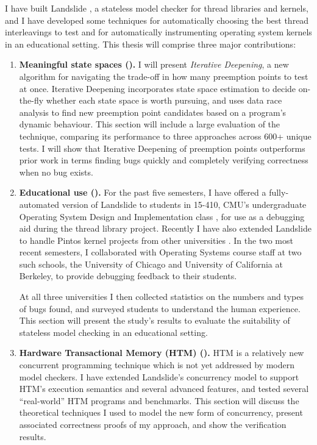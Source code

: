 \vspace{0.75em}

I have built Landslide \cite{landslide}, a stateless model checker for thread libraries and kernels,
and I have developed some techniques for automatically choosing the best thread interleavings to test
and for automatically instrumenting operating system kernels in an educational setting.
This thesis will comprise three major contributions:

\begin{enumerate}
	\item {\bf Meaningful state spaces ().}
		I will present {\em Iterative Deepening}, a new algorithm for navigating the trade-off in how many preemption points to test at once.
		Iterative Deepening incorporates state space estimation \cite{estimation} to decide on-the-fly whether each state space is worth pursuing, and uses data race analysis \cite{tsan} to find new preemption point candidates based on a program's dynamic behaviour.
		This section will include a large evaluation of the technique, comparing its performance to three  approaches across 600+ unique tests.
		I will show that Iterative Deepening of preemption points outperforms prior work in terms  finding bugs quickly and completely verifying correctness when no bug exists.
	\item {\bf Educational use ().}
		For the past five semesters, I have offered a fully-automated version of Landslide to students in 15-410, CMU's undergraduate Operating System Design and Implementation class \cite{kspec,thrlib}, for use as a debugging aid during the thread library project.
		Recently I have also extended Landslide to handle Pintos kernel projects from other universities \cite{pintos}.
		In the two most recent semesters, I collaborated with Operating Systems course staff at two such schools, the University of Chicago and University of California at Berkeley,
		to provide debugging feedback to their students.

		At all three universities I then collected statistics on the numbers and types of bugs found,
		and surveyed students to understand the human experience.
		This section will present the study's results
		to evaluate the suitability of stateless model checking in an educational setting.
	\item {\bf Hardware Transactional Memory (HTM) ().}
		HTM is a relatively new concurrent programming technique \cite{htm-haswell,htm-experience}
		which is not yet addressed by modern model checkers.
		I have extended Landslide's concurrency model to support
		HTM's execution semantics and several advanced features, %
		and tested several ``real-world'' HTM programs and benchmarks.
		This section will discuss the theoretical techniques I used to model the new form of concurrency,
		present associated correctness proofs of my approach,
		and show the verification results.
\end{enumerate}

